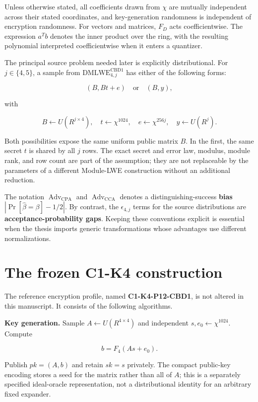 \documentclass[
  11pt,
  a4paper,
  oneside]{report}
\begin{document}
Unless otherwise stated, all coefficients drawn from \(\chi\) are
mutually independent across their stated coordinates, and key-generation
randomness is independent of encryption randomness. For vectors and
matrices, \(F_D\) acts coefficientwise. The expression \(a^Tb\) denotes
the inner product over the ring, with the resulting polynomial
interpreted coefficientwise when it enters a quantizer.

The principal source problem needed later is explicitly distributional.
For \(j\in\{4,5\}\), a sample from
\(\mathrm{DMLWE}_{4,j}^{\mathrm{CBD1}}\) has either of the following
forms:

\[
(B,Bt+e) \quad\text{or}\quad (B,y),
\]

with

\[
B\leftarrow U(R^{j\times4}),\quad
 t\leftarrow\chi^{1024},\quad
 e\leftarrow\chi^{256j},\quad
 y\leftarrow U(R^j).
\]

Both possibilities expose the same uniform public matrix \(B\). In the
first, the same secret \(t\) is shared by all \(j\) rows. The exact
secret and error law, modulus, module rank, and row count are part of
the assumption; they are not replaceable by the parameters of a
different Module-LWE construction without an additional reduction.

The notation \(\operatorname{Adv}_{\mathrm{CPA}}\) and
\(\operatorname{Adv}_{\mathrm{CCA}}\) denotes a distinguishing-success
\textbf{bias} \(|\Pr[\widehat\beta=\beta]-1/2|\). By contrast, the
\(\epsilon_{4,j}\) terms for the source distributions are
\textbf{acceptance-probability gaps}. Keeping these conventions explicit
is essential when the thesis imports generic transformations whose
advantages use different normalizations.

\section{The frozen C1-K4
construction}\label{the-frozen-c1-k4-construction}

The reference encryption profile, named \textbf{C1-K4-P12-CBD1}, is not
altered in this manuscript. It consists of the following algorithms.

\textbf{Key generation.} Sample \(A\leftarrow U(R^{4\times4})\) and
independent \(s,e_0\leftarrow\chi^{1024}\). Compute

\[
 b=F_4(As+e_0).
\]

Publish \(pk=(A,b)\) and retain \(sk=s\) privately. The compact
public-key encoding stores a seed for the matrix rather than all of
\(A\); this is a separately specified ideal-oracle representation, not a
distributional identity for an arbitrary fixed expander.
\end{document}
